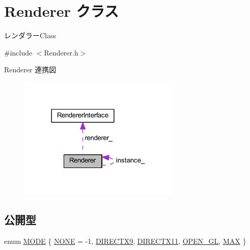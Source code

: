 \hypertarget{class_renderer}{}\section{Renderer クラス}
\label{class_renderer}


レンダラー\+Class  




{\ttfamily \#include $<$Renderer.\+h$>$}



Renderer 連携図\nopagebreak
\begin{figure}[H]
\begin{center}
\leavevmode
\includegraphics[width=218pt]{class_renderer__coll__graph}
\end{center}
\end{figure}
\subsection*{公開型}
\begin{DoxyCompactItemize}
\item 
enum \mbox{\hyperlink{class_renderer_ab5a9379ccadcf2b3394c61cf8c835fec}{M\+O\+DE}} \{ \newline
\mbox{\hyperlink{class_renderer_ab5a9379ccadcf2b3394c61cf8c835feca2a36637bde744b1f383e4fa8c3c10382}{N\+O\+NE}} = -\/1, 
\mbox{\hyperlink{class_renderer_ab5a9379ccadcf2b3394c61cf8c835feca6b296a07c01bb9de6258ca507e7c4eb6}{D\+I\+R\+E\+C\+T\+X9}}, 
\mbox{\hyperlink{class_renderer_ab5a9379ccadcf2b3394c61cf8c835fecaf72f39863653ad6fe6cb501a566fb714}{D\+I\+R\+E\+C\+T\+X11}}, 
\mbox{\hyperlink{class_renderer_ab5a9379ccadcf2b3394c61cf8c835fecac532ec7ed1c2ce77df467cbf829e575a}{O\+P\+E\+N\+\_\+\+GL}}, 
\newline
\mbox{\hyperlink{class_renderer_ab5a9379ccadcf2b3394c61cf8c835feca3304c74929f96df4042bc148ee9f3b50}{M\+AX}}
 \}
\end{DoxyCompactItemize}
